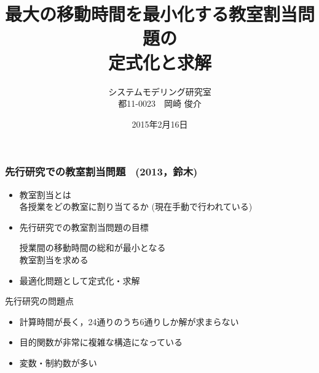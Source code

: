 \documentclass[dvipdfmx,12pt]{beamer}
\title{最大の移動時間を最小化する教室割当問題の\\定式化と求解}
\author{\Large {システムモデリング研究室\\都11-0023　岡崎 俊介}}
\date{{\Large 2015年2月16日}}
\begin{document}
\begin{frame}\frametitle{}
\titlepage
\end{frame}

\begin{frame}\frametitle{先行研究での教室割当問題 \ (2013，鈴木)}
\begin{itemize}
\vspace{-5pt}
\item 教室割当とは\\
各授業をどの教室に割り当てるか
(現在手動で行われている)\\
\item 先行研究での教室割当問題の目標\\
\vspace{-3pt}
\begin{screen}
\begin{center}
\vspace{-3pt}
{\large  授業間の移動時間の総和が最小となる}\\
{\large  教室割当を求める}\\
\vspace{-5pt}
\end{center}
\end{screen}
\item 最適化問題として定式化・求解\\
\end{itemize}
\vspace{-7pt}
\hrulefill

先行研究の問題点\\
\begin{itemize}
\item 計算時間が長く，24通りのうち6通りしか解が求まらない\\
\item 目的関数が非常に複雑な構造になっている\\
\item 変数・制約数が多い\\
\end{itemize}
\end{frame}
\end{document}
